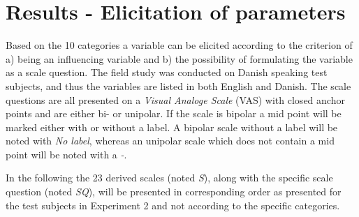 \section{Results - Elicitation of parameters}
\label{ResultsElicitation}
%
%
Based on the 10 categories a variable can be elicited according to the criterion of a) being an influencing variable and b) the possibility of formulating the variable as a scale question. The field study was conducted on Danish speaking test subjects, and thus the variables are listed in both English and Danish. The scale questions are all presented on a \textit{Visual Analoge Scale} (VAS) with closed anchor points and are either bi- or unipolar. If the scale is bipolar a mid point will be marked either with or without a label. A bipolar scale without a label will be noted with \textit{No label}, whereas an unipolar scale which does not contain a mid point will be noted with a \textit{-}. 

In the following the 23 derived scales (noted \textit{S}), along with the specific scale question (noted \textit{SQ}), will be presented in corresponding order as presented for the test subjects in Experiment 2 and not according to the specific categories.\\ 

